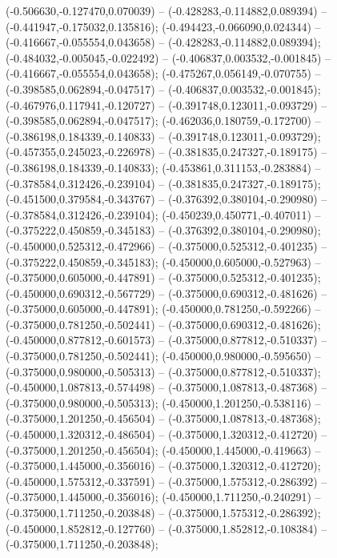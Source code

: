  (-0.506630,-0.127470,0.070039) -- (-0.428283,-0.114882,0.089394) -- (-0.441947,-0.175032,0.135816);
 (-0.494423,-0.066090,0.024344) -- (-0.416667,-0.055554,0.043658) -- (-0.428283,-0.114882,0.089394);
 (-0.484032,-0.005045,-0.022492) -- (-0.406837,0.003532,-0.001845) -- (-0.416667,-0.055554,0.043658);
 (-0.475267,0.056149,-0.070755) -- (-0.398585,0.062894,-0.047517) -- (-0.406837,0.003532,-0.001845);
 (-0.467976,0.117941,-0.120727) -- (-0.391748,0.123011,-0.093729) -- (-0.398585,0.062894,-0.047517);
 (-0.462036,0.180759,-0.172700) -- (-0.386198,0.184339,-0.140833) -- (-0.391748,0.123011,-0.093729);
 (-0.457355,0.245023,-0.226978) -- (-0.381835,0.247327,-0.189175) -- (-0.386198,0.184339,-0.140833);
 (-0.453861,0.311153,-0.283884) -- (-0.378584,0.312426,-0.239104) -- (-0.381835,0.247327,-0.189175);
 (-0.451500,0.379584,-0.343767) -- (-0.376392,0.380104,-0.290980) -- (-0.378584,0.312426,-0.239104);
 (-0.450239,0.450771,-0.407011) -- (-0.375222,0.450859,-0.345183) -- (-0.376392,0.380104,-0.290980);
 (-0.450000,0.525312,-0.472966) -- (-0.375000,0.525312,-0.401235) -- (-0.375222,0.450859,-0.345183);
 (-0.450000,0.605000,-0.527963) -- (-0.375000,0.605000,-0.447891) -- (-0.375000,0.525312,-0.401235);
 (-0.450000,0.690312,-0.567729) -- (-0.375000,0.690312,-0.481626) -- (-0.375000,0.605000,-0.447891);
 (-0.450000,0.781250,-0.592266) -- (-0.375000,0.781250,-0.502441) -- (-0.375000,0.690312,-0.481626);
 (-0.450000,0.877812,-0.601573) -- (-0.375000,0.877812,-0.510337) -- (-0.375000,0.781250,-0.502441);
 (-0.450000,0.980000,-0.595650) -- (-0.375000,0.980000,-0.505313) -- (-0.375000,0.877812,-0.510337);
 (-0.450000,1.087813,-0.574498) -- (-0.375000,1.087813,-0.487368) -- (-0.375000,0.980000,-0.505313);
 (-0.450000,1.201250,-0.538116) -- (-0.375000,1.201250,-0.456504) -- (-0.375000,1.087813,-0.487368);
 (-0.450000,1.320312,-0.486504) -- (-0.375000,1.320312,-0.412720) -- (-0.375000,1.201250,-0.456504);
 (-0.450000,1.445000,-0.419663) -- (-0.375000,1.445000,-0.356016) -- (-0.375000,1.320312,-0.412720);
 (-0.450000,1.575312,-0.337591) -- (-0.375000,1.575312,-0.286392) -- (-0.375000,1.445000,-0.356016);
 (-0.450000,1.711250,-0.240291) -- (-0.375000,1.711250,-0.203848) -- (-0.375000,1.575312,-0.286392);
 (-0.450000,1.852812,-0.127760) -- (-0.375000,1.852812,-0.108384) -- (-0.375000,1.711250,-0.203848);
